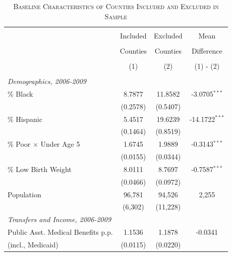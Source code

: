 \begin{table}[!htbp] 
	\begin{center}
		\caption{\textsc{Baseline Characteristics of Counties Included and Excluded in Sample}} 
		\label{included} 
		\footnotesize 
		\begin{tabular}{@{\extracolsep{0pt}}lccc } 
			\\[-1.8ex]\hline 
			\hline 
			\\[-1.8ex] & \multicolumn{1}{c}{Included} & \multicolumn{1}{c}{Excluded}& \multicolumn{1}{c}{Mean}\\ 
			\\[-1.8ex] & \multicolumn{1}{c}{Counties} & \multicolumn{1}{c}{Counties}& \multicolumn{1}{c}{Difference}\\ 
			\\[-1.8ex] & \multicolumn{1}{c}{(1)} & \multicolumn{1}{c}{(2)}& \multicolumn{1}{c}{(1) - (2)}\\ 
			\hline \\[-1.8ex] 
			\multicolumn{3}{l}{\textit{Demographics, 2006-2009}} & \\ 
			[1.2ex]
			\hspace{12pt} \% Black & 8.7877 & 11.8582 & -3.0705$^{***}$ \\ 
			& (0.2578) & (0.5407) & \\ 
			[1.2ex]
			\hspace{12pt} \% Hispanic &  5.4517 & 19.6239 & -14.1722$^{***}$ \\ 
			& (0.1464) & (0.8519) & \\ 
			[1.2ex]
			\hspace{12pt} \% Poor $\times$ Under Age 5 & 1.6745 & 1.9889 & -0.3143$^{***}$ \\ 
			& (0.0155) & (0.0344) & \\
			[1.2ex]
			\hspace{12pt} \% Low Birth Weight & 8.0111 & 8.7697 & -0.7587$^{***}$ \\ 
			& (0.0466) & (0.0972) & \\ 
			[1.2ex]
			\hspace{12pt} Population & 96,781 & 94,526 & 2,255\\ 
			& (6,302) & (11,228) & \\ 
			[1.2ex]
			\multicolumn{3}{l}{\textit{Transfers and Income, 2006-2009}} & \\ 
			[1.2ex]
			\hspace{12pt} Public Asst. Medical Benefits p.p. & 1.1536 & 1.1878 & -0.0341 \\
			\hspace{24pt} (incl., Medicaid)  & (0.0115) & (0.0220) & \\  

\end{tabular}
\end{center}
\end{table}
